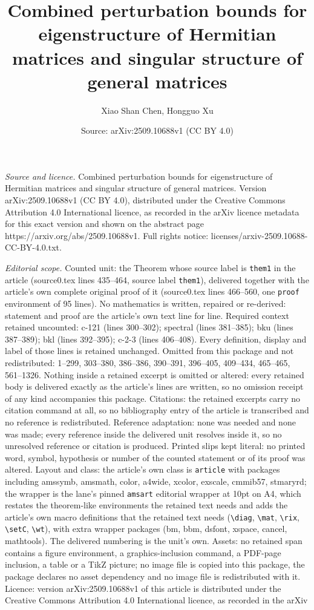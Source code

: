 \documentclass[10pt,a4paper]{amsart}
\title[Combined perturbation bounds for eigenstructure of Hermitian]{Combined perturbation bounds for eigenstructure of Hermitian matrices and singular structure of general matrices}
\author{Xiao Shan Chen, Hongguo Xu}
\date{Source: arXiv:2509.10688v1 (CC BY 4.0)}
\begin{document}
\maketitle

\noindent\emph{Source and licence.} Combined perturbation bounds for eigenstructure of Hermitian matrices and singular structure of general matrices. Version arXiv:2509.10688v1 (CC BY 4.0), distributed under the Creative Commons Attribution 4.0 International licence, as recorded in the arXiv licence metadata for this exact version and shown on the abstract page https://arxiv.org/abs/2509.10688v1. Full rights notice: licenses/arxiv-2509.10688-CC-BY-4.0.txt.\par\smallskip

\noindent\textit{Editorial scope.} Counted unit: the Theorem whose source label is \texttt{them1} in the article (source0.tex lines 435--464, source label \texttt{them1}), delivered together with the article's own complete original proof of it (source0.tex lines 466--560, one \texttt{proof} environment of 95 lines). No mathematics is written, repaired or re-derived: statement and proof are the article's own text line for line. Required context retained uncounted: c-121 (lines 300--302); spectral (lines 381--385); bku (lines 387--389); bkl (lines 392--395); c-2-3 (lines 406--408). Every definition, display and label of those lines is retained unchanged. Omitted from this package and not redistributed: 1--299, 303--380, 386--386, 390--391, 396--405, 409--434, 465--465, 561--1326. Nothing inside a retained excerpt is omitted or altered: every retained body is delivered exactly as the article's lines are written, so no omission receipt of any kind accompanies this package. Citations: the retained excerpts carry no citation command at all, so no bibliography entry of the article is transcribed and no reference is redistributed. Reference adaptation: none was needed and none was made; every reference inside the delivered unit resolves inside it, so no unresolved reference or citation is produced. Printed slips kept literal: no printed word, symbol, hypothesis or number of the counted statement or of its proof was altered. Layout and class: the article's own class is \texttt{article} with packages including amssymb, amsmath, color, a4wide, xcolor, exscale, cmmib57, stmaryrd; the wrapper is the lane's pinned \texttt{amsart} editorial wrapper at 10pt on A4, which restates the theorem-like environments the retained text needs and adds the article's own macro definitions that the retained text needs (\texttt{\textbackslash diag}, \texttt{\textbackslash mat}, \texttt{\textbackslash rix}, \texttt{\textbackslash setC}, \texttt{\textbackslash wt}), with extra wrapper packages (bm, bbm, dsfont, xspace, cancel, mathtools). The delivered numbering is the unit's own. Assets: no retained span contains a figure environment, a graphics-inclusion command, a PDF-page inclusion, a table or a TikZ picture; no image file is copied into this package, the package declares no asset dependency and no image file is redistributed with it. Licence: version arXiv:2509.10688v1 of this article is distributed under the Creative Commons Attribution 4.0 International licence, as recorded in the arXiv 
\end{document}
